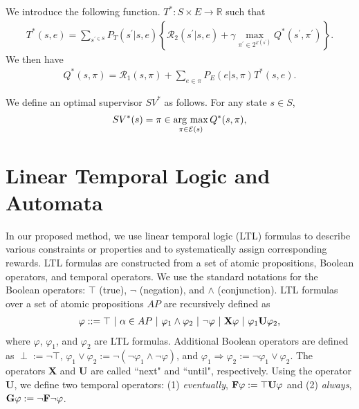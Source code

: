 \begin{definition}
  We introduce the following function. $T^{\ast} : S \times E \rightarrow \mathbb{R}$ such that
  \begin{align}
    T^{\ast}(s,e) = \sum_{s^{\prime \in S}} P_T(s^{\prime}|s,e) \left \{ \mathcal{R}_2(s^{\prime}|s,e) + \gamma \max_{\pi^{\prime} \in 2^{\mathcal{E}(s^{\prime})}} Q^{\ast}(s^{\prime}, \pi^{\prime}) \right \}.
  \end{align}
  We then have
  \begin{align}
    Q^{\ast}(s,\pi) = \mathcal{R}_1(s,\pi) + \sum_{e \in \pi}P_E(e|s,\pi) T^{\ast}(s,e).
  \end{align}

\end{definition}

\begin{definition}
We define an optimal supervisor $SV^{\ast}$ as follows. For any state $s \in S$,
\begin{align}
  SV^{\ast}(s) = \pi \in \mathop{\rm arg~max}\limits_{\pi \in \mathcal{E}(s)} Q^{\ast}(s,\pi),
\end{align}
\end{definition}

\section{Linear Temporal Logic and Automata}

In our proposed method, we use linear temporal logic (LTL) formulas to describe various constraints or properties and to systematically assign corresponding rewards.
LTL formulas are constructed from a set of atomic propositions, Boolean operators, and temporal operators. We use the standard notations for the Boolean operators: $\top$ (true), $\neg$ (negation), and $\land$ (conjunction).
LTL formulas over a set of atomic propositions $AP$ are recursively defined as
\begin{align*}
  \varphi ::=\top\ |\ \alpha \in AP\ |\ \varphi_1 \land \varphi_2\ |\ \neg \varphi\ |\ \text{{\bf X}} \varphi\ |\ \varphi_1 \text{{\bf U}} \varphi_2,
\end{align*}
where $\varphi$, $\varphi_1$, and $\varphi_2$ are LTL formulas.
Additional Boolean operators are defined as $\perp := \neg \top $, $\varphi_1 \lor \varphi_2 := \neg(\neg \varphi_1 \land \neg \varphi)$, and $\varphi_1 \Rightarrow \varphi_2 := \neg \varphi_1 \lor \varphi_2$.
The operators {\bf X} and {\bf U} are called ``next" and ``until", respectively.
Using the operator {\bf U}, we define two temporal operators: (1) {\it eventually}, $\text{{\bf F}} \varphi := \top \text{{\bf U}} \varphi $ and (2) {\it always}, $\text{{\bf G}} \varphi := \neg \text{{\bf F}} \neg \varphi$.

